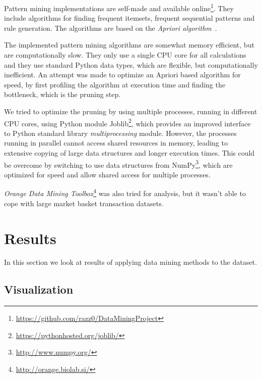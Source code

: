 \documentclass[english]{tktltiki2}
\begin{document}
Pattern mining implementations are self-made and available online\footnote{\url{https://github.com/razz0/DataMiningProject}}. They include algorithms for finding frequent itemsets, frequent sequential patterns and rule generation. The algorithms are based on the \emph{Apriori algorithm}~\cite{tan2006introduction}.

The implemented pattern mining algorithms are somewhat memory efficient, but are computationally slow. They only use a single CPU core for all calculations and they use standard Python data types, which are flexible, but computationally inefficient. An attempt was made to optimize an Apriori based algorithm for speed, by first profiling the algorithm at execution time and finding the bottleneck, which is the pruning step.

We tried to optimize the pruning by using multiple processes, running in different CPU cores, using Python module Joblib\footnote{\url{https://pythonhosted.org/joblib/}}, which provides an improved interface to Python standard library \emph{multiprocessing} module. However, the processes running in parallel cannot access shared resources in memory, leading to extensive copying of large data structures and longer execution times. This could be overcome by switching to use data structures from NumPy\footnote{\url{http://www.numpy.org/}}, which are optimized for speed and allow shared access for multiple processes.

\emph{Orange Data Mining Toolbox}\footnote{\url{http://orange.biolab.si/}} was also tried for analysis, but it wasn't able to cope with large market basket transaction datasets.



\section{Results}

In this section we look at results of applying data mining methods to the dataset.



\subsection{Visualization}
\end{document}
